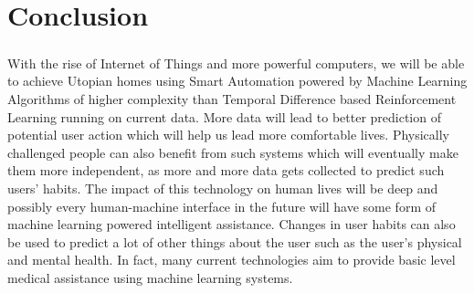 \chapter{Conclusion}

\paragraph{}
With the rise of Internet of Things and more powerful computers, we will be able to achieve Utopian homes using Smart Automation powered by Machine Learning Algorithms of higher complexity than Temporal Difference based Reinforcement Learning running on current data. More data will lead to better prediction of potential user action which will help us lead more comfortable lives. Physically challenged people can also benefit from such systems which will eventually make them more independent, as more and more data gets collected to predict such users' habits. The impact of this technology on human lives will be deep and possibly every human-machine interface in the future will have some form of machine learning powered intelligent assistance. Changes in user habits can also be used to predict a lot of other things about the user such as the user's physical and mental health. In fact, many current technologies aim to provide basic level medical assistance using machine learning systems.
